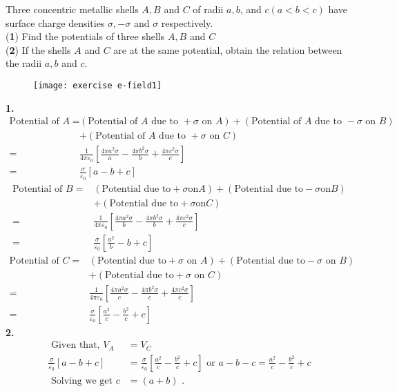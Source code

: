 \begin{exercise}
	Three concentric metallic shells $A, B$ and $C$ of radii $a, b$, and $c(a<b<c)$ have surface charge densities
	$\sigma,-\sigma$ and $\sigma$ respectively.\\
	(\textbf{1}) Find the potentials of three shells $A, B$ and $C$\\
	(\textbf{2}) If the shells $A$ and $C$ are at the same potential, obtain the relation between the radii $a, b$ and $c .$
	\begin{figure}[H]
		\begin{center}
			\texttt{[image: exercise e-field1]}
		\end{center}
	\end{figure}
\end{exercise}
\begin{answer}\textbf{1.}\\
	\begin{align*}
	\text{Potential of } A =&(\text{Potential of } A \text{ due to }+\sigma \text{ on }A)+(\text{Potential of } A \text{ due to }-\sigma \text{ on }B)\\&+(\text{Potential of } A \text{ due to }+\sigma \text{ on }C)\\
	=&\frac{1}{4 \pi \varepsilon_{0}}\left[\frac{4 \pi a^{2} \sigma}{a}-\frac{4 \pi b^{2} \sigma}{b}+\frac{4 \pi c^{2} \sigma}{c}\right]\\
	=&\frac{\sigma}{\varepsilon_{0}}[a-b+c]
	\end{align*}
	\begin{align*}
\text{Potential of } B =&( \text{Potential due to} +\sigma \text{on} A)+( \text{Potential due to} -\sigma \text{on} B)\\&+( \text{Potential due to} +\sigma \text{on} C)\\
=&\frac{1}{4 \pi \varepsilon_{0}}\left[\frac{4 \pi a^{2} \sigma}{b}-\frac{4 \pi b^{2} \sigma}{b}+\frac{4 \pi c^{2} \sigma}{c}\right]\\
=&\frac{\sigma}{\varepsilon_{0}}\left[\frac{a^{2}}{b}-b+c\right]
	\end{align*}
	\begin{align*}	
	\text{Potential of } C =&( \text{Potential due to}  +\sigma \text{ on } A)+( \text{Potential due to} -\sigma \text{ on } B)\\&+( \text{Potential due to} +\sigma \text{ on } C)\\
	=&\frac{1}{4 \pi \varepsilon_{0}}\left[\frac{4 \pi a^{2} \sigma}{c}-\frac{4 \pi b^{2} \sigma}{c}+\frac{4 \pi c^{2} \sigma}{c}\right]\\
	=&\frac{\sigma}{\varepsilon_{0}}\left[\frac{a^{2}}{c}-\frac{b^{2}}{c}+c\right]
	\end{align*}
	\textbf{2.}\\
	\begin{align*}
		\text { Given that, } V_{A}&=V_{C}\\
		\frac{\sigma}{\varepsilon_{0}}[a-b+c]&=\frac{\sigma}{\varepsilon_{0}}\left[\frac{a^{2}}{c}-\frac{b^{2}}{c}+c\right] \text { or } a-b-c=\frac{a^{2}}{c}-\frac{b^{2}}{c}+c\\
		\text { Solving we get } c&=(a+b) \text { . }
	\end{align*}

	
\end{answer}
